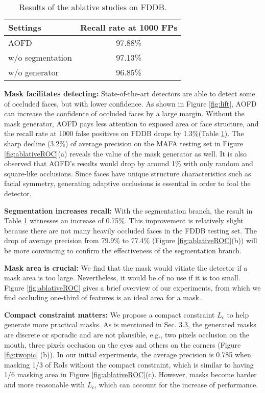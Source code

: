 \documentclass[10pt,twocolumn,letterpaper]{article}
\begin{document}
\begin{table}
	\renewcommand{\arraystretch}{1.5}
	 \begin{center}
	\begin{tabular}{|l|c|}
		\hline
		Settings & \multicolumn{1}{l|}{Recall rate at 1000 FPs} \\
		\hline\hline
		AOFD & 97.88\% \\
w/o segmentation & 97.13\% \\
w/o generator & 96.85\% \\
\hline
	\end{tabular}
	 \end{center}
        \caption{Results of the ablative studies on FDDB.}
	\label{tab:ablation}
\end{table}




\textbf{Mask facilitates detecting:} State-of-the-art detectors are able to detect some of occluded faces, but with lower confidence. As shown in Figure \ref{fig:lift}, AOFD can increase the confidence of occluded faces by a large margin. Without the mask generator, AOFD pays less attention to exposed area or face structure, and the recall rate at 1000 false positives on FDDB drops by 1.3\%(Table \ref{tab:ablation}). The sharp decline (3.2\%) of average precision on the MAFA testing set in Figure \ref{fig:ablativeROC}(a) reveals the value of the mask generator as well.
It is also observed that AOFD's results would drop by around 1\% with only random and square-like occlusions. Since faces have unique structure characteristics such as facial symmetry, generating adaptive occlusions is essential in order to fool the detector.


\textbf{Segmentation increases recall:} With the segmentation branch, the result in Table \ref{tab:ablation} witnesses an increase of 0.75\%. This improvement is relatively slight because there are not many heavily occluded faces in the FDDB testing set.
The drop of average precision from 79.9\% to 77.4\% (Figure \ref{fig:ablativeROC}(b)) will be more convincing to confirm the effectiveness of the segmentation branch. 


\textbf{Mask area is crucial:} We find that the mask would vitiate the detector if a mask area is too large. Nevertheless, it would be of no use if it is too small. Figure \ref{fig:ablativeROC} gives a brief overview of our experiments, from which we find occluding one-third of features is an ideal area for a mask. 


\textbf{Compact constraint matters:} We propose a compact constraint $L_c$ to help generate more practical masks.
As is mentioned in Sec. 3.3, the generated masks are discrete or sporadic and are not plausible, e.g., two pixels occlusion on the mouth, three pixels occlusion on the eyes and others on the corners (Figure \ref{fig:twopic} (b)). In our initial experiments, the average precision is 0.785 when masking 1/3 of RoIs without the compact constraint, which is similar to having 1/6 masking area in Figure \ref{fig:ablativeROC}(c). However, masks become harder and more reasonable with $L_c$, which can account for the increase of performance. 
\end{document}
